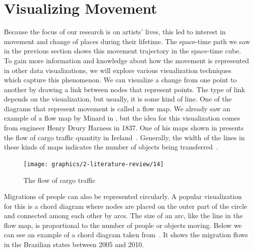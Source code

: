 \clearpage
\section{Visualizing Movement}\label{sec:visualizing-movement}

Because the focus of our research is on artists' lives, this led to interest in movement and change of places during their lifetime. The space-time
path we saw in the previous section shows this movement trajectory in the space-time cube. To gain more information and knowledge about how the
movement is represented in other data visualizations, we will explore various visualization techniques which capture this phenomenon. We can
visualize a change from one point to another by drawing a link between nodes that represent points. The type of link depends on the visualization,
but usually, it is some kind of line. One of the diagrams that represent movement is called a flow map. We already saw an example of a flow map by
Minard in , but the idea for this visualization comes from engineer Henry Drury Harness in 1837. One of his maps shown in
 presents the flow of cargo traffic quantity in Ireland~\citep{irish1838atlas, robinson19551837}.
Generally, the width of the lines in these kinds of maps indicates the number of objects being transferred~\citep{phan2005flow}.

\begin{figure}[h]
    \begin{center}
        \texttt{[image: graphics/2-literature-review/14]}
    \end{center}
    \caption{The flow of cargo traffic}
    \label{fig:figure2.14}
\end{figure}

\clearpage

Migrations of people can also be represented circularly. A popular visualization for this is a chord diagram where nodes are placed on
the outer part of the circle and connected among each other by arcs. The size of an arc, like the line in the flow map, is proportional to
the number of people or objects moving. Below we can see an example of a chord diagram taken from~\citep{baptista2018internal}. It shows the
migration flows in the Brazilian states between 2005 and 2010.

